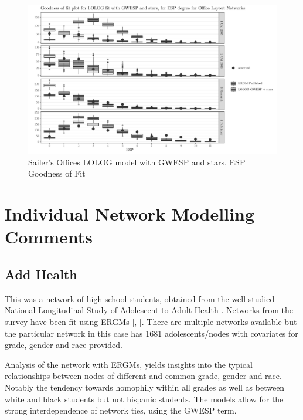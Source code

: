 \documentclass[
]{statsoc}
\begin{document}
\begin{figure}[h]

{\centering \includegraphics{lolog_catelog_writeup_JRSSA_major_revisions_git_files/figure-latex/unnamed-chunk-12-1} 

}

\caption{\label{fig:sailer_gof_gwesp_star_esp}Sailer's Offices LOLOG model with GWESP and stars, ESP Goodness of Fit}\label{fig:unnamed-chunk-12}
\end{figure}

\section{Individual Network Modelling Comments}\label{app:comments}

\subsection{Add Health}

This was a network of high school students, obtained from the well
studied National Longitudinal Study of Adolescent to Adult Health
\citep{AddHealth2007}. Networks from the survey have been fit using
ERGMs {[}\cite{Goodreau2007}, \cite{Hunter_Goodreau_2008}{]}. There are
multiple networks available but the particular network in this case has
1681 adolescents/nodes with covariates for grade, gender and race
provided.

Analysis of the network with ERGMs, yields insights into the typical
relationships between nodes of different and common grade, gender and
race. Notably the tendency towards homophily within all grades as well
as between white and black students but not hispanic students. The
models allow for the strong interdependence of network ties, using the
GWESP term.
\end{document}
